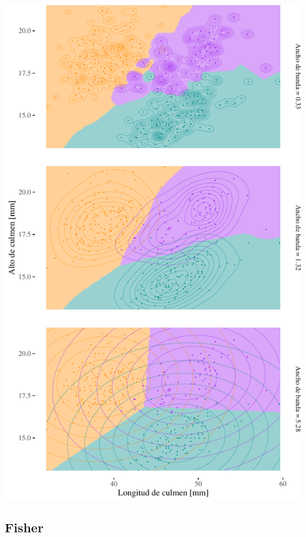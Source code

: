 \documentclass[]{tufte-handout}
\begin{document}
\begin{center}\includegraphics{TP-Labo-2_files/figure-latex/unnamed-chunk-7-1} \end{center}

\hypertarget{fisher}{%
\subsection{Fisher}\label{fisher}}
\end{document}

